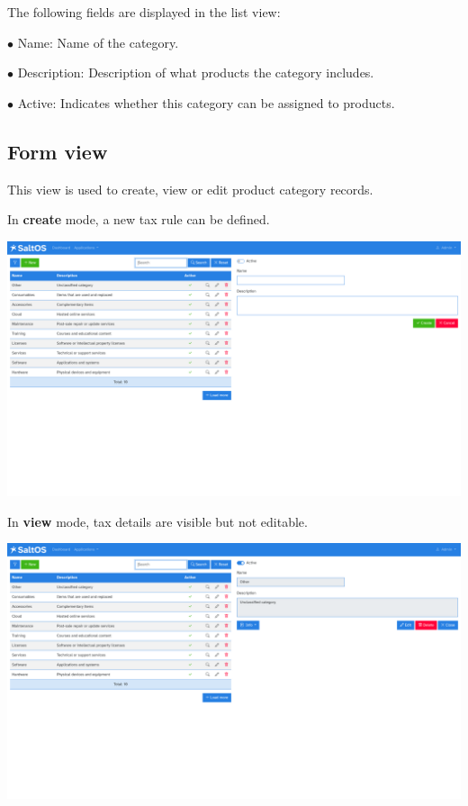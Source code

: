 \documentclass[a4paper]{article}
\begin{document}
The following fields are displayed in the list view:

\begin{compactitem}
\item[\color{myblue}$\bullet$] Name: Name of the category.
\item[\color{myblue}$\bullet$] Description: Description of what products the category includes.
\item[\color{myblue}$\bullet$] Active: Indicates whether this category can be assigned to products.
\end{compactitem}

\hypertarget{toc159}{}
\subsection{Form view}

This view is used to create, view or edit product category records.

In \textbf{create} mode, a new tax rule can be defined.

\begin{center}\includegraphics[width=1\textwidth]{../ujest/snaps/test-screenshots-js-screenshots-sales-products-categories-create-en-us-1-snap.png}\end{center}

In \textbf{view} mode, tax details are visible but not editable.

\begin{center}\includegraphics[width=1\textwidth]{../ujest/snaps/test-screenshots-js-screenshots-sales-products-categories-view-10-en-us-1-snap.png}\end{center}
\end{document}
